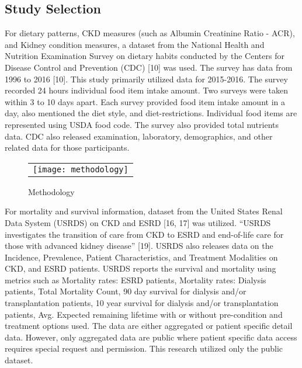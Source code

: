 \subsection{Study Selection}
For dietary patterns, CKD measures (such as Albumin Creatinine Ratio - ACR), and Kidney condition measures, a dataset from the National Health and Nutrition Examination Survey on dietary habits conducted by the Centers for Disease Control and Prevention (CDC) [10] was used. The survey has data from 1996 to 2016 [10]. This study primarily utilized data for 2015-2016. The survey recorded 24 hours individual food item intake amount. Two surveys were taken within 3 to 10 days apart. Each survey provided food item intake amount in a day, also mentioned the diet style, and diet-restrictions. Individual food items are represented using USDA food code. The survey also provided total nutrients data. CDC also released examination, laboratory, demographics, and other related data for those participants.
\begin{figure}
\centering
\caption{Methodology}
\begin{tabular}{p{15.5cm}}
\noindent \texttt{[image: methodology]}   \\
\end{tabular}
\end{figure}

\noindent For mortality and survival information, dataset from the United States Renal Data System (USRDS) on CKD and ESRD [16, 17] was utilized. “USRDS investigates the transition of care from CKD to ESRD and end-of-life care for those with advanced kidney disease” [19]. USRDS also releases data on the Incidence, Prevalence, Patient Characteristics, and Treatment Modalities on CKD, and ESRD patients. USRDS reports the survival and mortality using metrics such as Mortality rates: ESRD patients,  Mortality rates: Dialysis patients, Total Mortality Count, 90 day survival for dialysis and/or transplantation patients, 10 year survival for dialysis and/or transplantation patients, Avg. Expected remaining lifetime with or without pre-condition and treatment options used. The data are either aggregated or patient specific detail data. However, only aggregated data are public where patient specific data access requires special request and permission. This research utilized only the public dataset.

